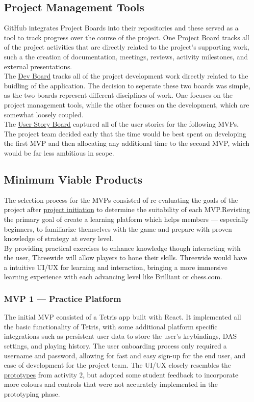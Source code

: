 \documentclass[english,course]{lecture}
\begin{document}
\subsection{Project Management Tools}
GitHub integrates Project Boards into their repositories and these served as a tool to track progress over the course of the project. One \href{https://github.com/orgs/teamcrusher/projects/3}{Project Board} tracks all of the project activities that are directly related to the project's supporting work, such a the creation of documentation, meetings, reviews, activity milestones, and external presentations.
%
\\The \href{https://github.com/orgs/teamcrusher/projects/2}{Dev Board} tracks all of the project development work directly related to the buidling of the application. The decision to seperate these two boards was simple, as the two boards represent different disciplines of work. One focuses on the project management tools, while the other focuses on the development, which are somewhat loosely coupled.
%
\\The \href{https://github.com/orgs/teamcrusher/projects/4}{User Story Board} captured all of the user stories for the following MVPs. The project team decided early that the time would be best spent on developing the first MVP and then allocating any additional time to the second MVP, which would be far less ambitious in scope.
%
\subsection{Minimum Viable Products}
The selection process for the MVPs consisted of re-evaluating the goals of the project after \href{https://github.com/teamcrusher/threewide/tree/main/Project%20Initiation}{project initiation}
to determine the suitability of each MVP.\@ Revisting the primary goal of create a learning platform which helps members --- especially beginners, to familiarize themselves with the game and prepare with proven knowledge of strategy at every level.
%
\\By providing practical exercises to enhance knowledge though interacting with the user, Threewide will allow players to hone their skills. Threewide would have a intuitive UI/UX for learning and interaction, bringing a more immersive learning experience with each advancing level like Brilliant or chess.com.
%
\subsubsection*{MVP 1 --- Practice Platform}
The initial MVP consisted of a Tetris app built with React. It implemented all the basic functionality of Tetris, with some additional platform specific integrations such as persistent user data to store the user's keybindings, DAS settings, and playing history. The user onboarding process only required a username and password, allowing for fast and easy sign-up for the end user, and ease of development for the project team. The UI/UX closely resembles the \href{https://github.com/teamcrusher/threewide/blob/main/Design%20documentation/Prototypes.md}{prototypes} from activity 2, but adopted some student feedback to incorporate more colours and controls that were not accurately implemented in the prototyping phase.
%
\end{document}
